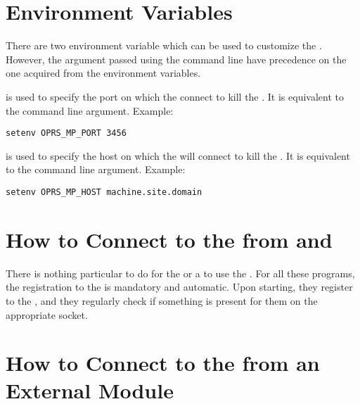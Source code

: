 \section{\MPK{} Environment Variables}

There are two environment variable which can be used to customize the
\MPK{}. However, the  argument passed using the command line
have precedence on the one acquired from the environment variables.

\begin{description}

\item[\code{OPRS\_MP\_PORT}] is used  to specify the port on which the \MPK{}
connect to kill the \MP{}. It is equivalent to the  command line
argument.\* 
Example:
\begin{verbatim}
setenv OPRS_MP_PORT 3456
\end{verbatim}

\item[\code{OPRS\_MP\_HOST}] is used  to specify the host on which the \MPK{} will
connect to kill the \MP. It is equivalent to the  command line argument.\* 
Example:
\begin{verbatim}
setenv OPRS_MP_HOST machine.site.domain
\end{verbatim}

\end{description}

\section{How to Connect to the \MP{} from \OPRSS{} and \CPK{}}

There is nothing particular to do for the \OPRSS{} or a \CPK{} to use the
\MP{}. For all these programs, the registration to the \MP{} is mandatory and
automatic. Upon starting, they register to the \MP{}, and they regularly check
if something is present for them on the appropriate socket.

\section{How to Connect to the \MP{} from an External Module}

